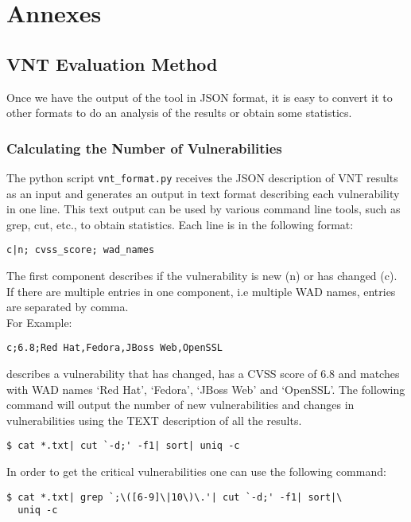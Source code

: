 \chapter{Annexes}
\label{app}


\section{VNT Evaluation Method}
\label{vnt_evaluation_method}
Once we have the output of the tool in JSON format, it is easy to convert it to other formats to do an analysis of the results or obtain some statistics. 
\subsection{Calculating the Number of Vulnerabilities}
The python script \texttt{vnt\_format.py} receives the JSON description of VNT results as an input and generates an output in text format describing each vulnerability in one line. This text output can be used by various command line tools, such as grep, cut, etc., to obtain statistics. 
Each line is in the following format:
\begin{framed}

\texttt{c|n;%
cvss\_score;%
wad\_names
}

\end{framed}
The first component describes if the vulnerability is new (n) or has changed (c). If there are multiple entries in one component, i.e multiple WAD names, entries are separated by comma.
\\
For Example:
\begin{framed}
\texttt{c;6.8;Red Hat,Fedora,JBoss Web,OpenSSL}
\end{framed}
describes a vulnerability that has changed, has a CVSS score of 6.8 and matches with WAD names `Red Hat', `Fedora', `JBoss Web' and `OpenSSL'.
The following command will output the number of new vulnerabilities and changes in vulnerabilities using the TEXT description of all the results. 
\begin{framed}
\begin{verbatim}
$ cat *.txt| cut `-d;' -f1| sort| uniq -c
\end{verbatim}
\end{framed}
In order to get the critical vulnerabilities one can use the following command:
\begin{framed}
\begin{verbatim}
$ cat *.txt| grep `;\([6-9]\|10\)\.'| cut `-d;' -f1| sort|\
  uniq -c
\end{verbatim}
\end{framed}
